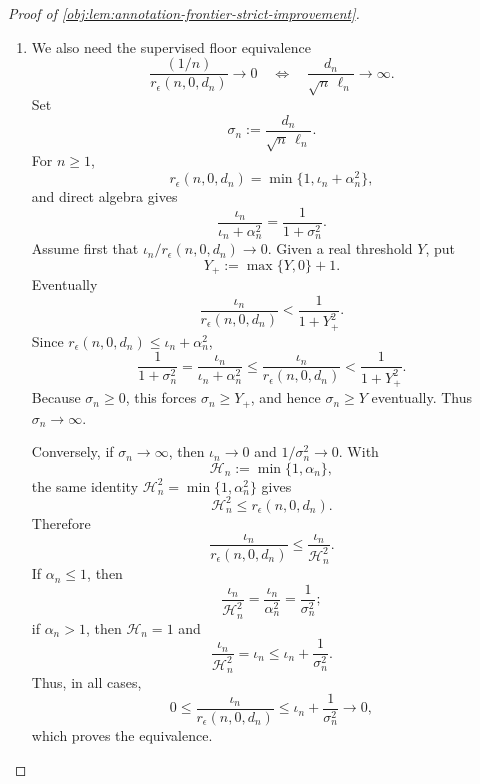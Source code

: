 \begin{proof}[Proof of \cref{obj:lem:annotation-frontier-strict-improvement}]
\begin{enumerate}
Conversely, assume
\[
\frac{\iota_n}{\mathcal R^0_n}\to0,
\qquad
\frac{\beta_n}{\mathcal H_n}\to0.
\]
Then \(\beta_n^2/\mathcal H_n^2\to0\), and since
\(\mathcal H_n^2\le\mathcal R^0_n\),
\[
0\le
\frac{\beta_n^2}{\mathcal R^0_n}
\le
\frac{\beta_n^2}{\mathcal H_n^2}
\to0.
\]
Finally,
\[
0\le
\frac{\mathcal R_n}{\mathcal R^0_n}
\le
\frac{\iota_n+\beta_n^2}{\mathcal R^0_n}
=
\frac{\iota_n}{\mathcal R^0_n}
+
\frac{\beta_n^2}{\mathcal R^0_n}
\to0,
\]
which is exactly \(\mathcal R_n=o(\mathcal R^0_n)\).

\item
We also need the supervised floor equivalence
\[
\frac{(1/n)}{r_\epsilon(n,0,d_n)}\to0
\quad\Longleftrightarrow\quad
\frac{d_n}{\sqrt n\,\ell_n}\to\infty.
\]
Set
\[
\sigma_n:=\frac{d_n}{\sqrt n\,\ell_n}.
\]
For \(n\ge1\),
\[
r_\epsilon(n,0,d_n)=\min\{1,\iota_n+\alpha_n^2\},
\]
and direct algebra gives
\[
\frac{\iota_n}{\iota_n+\alpha_n^2}
=
\frac1{1+\sigma_n^2}.
\]
Assume first that \(\iota_n/r_\epsilon(n,0,d_n)\to0\).  Given a real threshold \(Y\), put
\[
Y_+:=\max\{Y,0\}+1.
\]
Eventually
\[
\frac{\iota_n}{r_\epsilon(n,0,d_n)}
<
\frac1{1+Y_+^2}.
\]
Since \(r_\epsilon(n,0,d_n)\le \iota_n+\alpha_n^2\),
\[
\frac1{1+\sigma_n^2}
=
\frac{\iota_n}{\iota_n+\alpha_n^2}
\le
\frac{\iota_n}{r_\epsilon(n,0,d_n)}
<
\frac1{1+Y_+^2}.
\]
Because \(\sigma_n\ge0\), this forces \(\sigma_n\ge Y_+\), and hence \(\sigma_n\ge Y\) eventually.  Thus \(\sigma_n\to\infty\).

Conversely, if \(\sigma_n\to\infty\), then \(\iota_n\to0\) and \(1/\sigma_n^2\to0\).  With
\[
\mathcal H_n:=\min\{1,\alpha_n\},
\]
the same identity \(\mathcal H_n^2=\min\{1,\alpha_n^2\}\) gives
\[
\mathcal H_n^2\le r_\epsilon(n,0,d_n).
\]
Therefore
\[
\frac{\iota_n}{r_\epsilon(n,0,d_n)}
\le
\frac{\iota_n}{\mathcal H_n^2}.
\]
If \(\alpha_n\le1\), then
\[
\frac{\iota_n}{\mathcal H_n^2}
=
\frac{\iota_n}{\alpha_n^2}
=
\frac1{\sigma_n^2};
\]
if \(\alpha_n>1\), then \(\mathcal H_n=1\) and
\[
\frac{\iota_n}{\mathcal H_n^2}
=
\iota_n
\le
\iota_n+\frac1{\sigma_n^2}.
\]
Thus, in all cases,
\[
0\le
\frac{\iota_n}{r_\epsilon(n,0,d_n)}
\le
\iota_n+\frac1{\sigma_n^2}\to0,
\]
which proves the equivalence.


\end{enumerate}
\end{proof}
